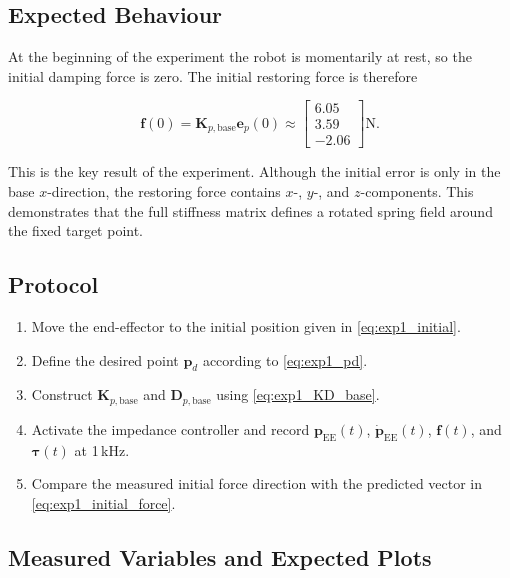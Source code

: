 \subsection{Expected Behaviour}

At the beginning of the experiment the robot is momentarily at rest, so the
initial damping force is zero. The initial restoring force is therefore

\begin{equation}
\label{eq:exp1_initial_force}
\mathbf{f}(0)
=
\mathbf{K}_{p,\mathrm{base}}\mathbf{e}_p(0)
\approx
\begin{bmatrix}
6.05\\3.59\\-2.06
\end{bmatrix}
\mathrm{N}.
\end{equation}

This is the key result of the experiment. Although the initial error is only in
the base \(x\)-direction, the restoring force contains \(x\)-, \(y\)-, and
\(z\)-components. This demonstrates that the full stiffness matrix defines a
rotated spring field around the fixed target point.

\subsection{Protocol}

\begin{enumerate}
  \item Move the end-effector to the initial position given in
        \cref{eq:exp1_initial}.
  \item Define the desired point \(\mathbf{p}_d\) according to
        \cref{eq:exp1_pd}.
  \item Construct \(\mathbf{K}_{p,\mathrm{base}}\) and
        \(\mathbf{D}_{p,\mathrm{base}}\) using
        \cref{eq:exp1_KD_base}.
  \item Activate the impedance controller and record
        \(\mathbf{p}_{\mathrm{EE}}(t)\), \(\dot{\mathbf{p}}_{\mathrm{EE}}(t)\),
        \(\mathbf{f}(t)\), and \(\boldsymbol{\tau}(t)\) at 1\,kHz.
  \item Compare the measured initial force direction with the predicted
        vector in \cref{eq:exp1_initial_force}.
\end{enumerate}

\subsection{Measured Variables and Expected Plots}

